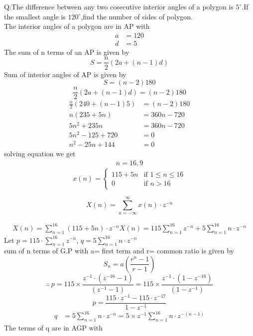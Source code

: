 \documentclass[journal,12pt,onecolumn]{IEEEtran}
\theoremstyle{remark}
\begin{document}
\let\vec\mathbf




\vspace{3cm}



\bigskip

\renewcommand{\thefigure}{\theenumi}
\renewcommand{\thetable}{\theenumi}
Q:The difference between any two cosecutive interior angles of a polygon is $5^\circ$.If the smallest angle is $120^\circ$,find the number of sides of polygon.
\\\solution
The interior angles of a polygon are in AP with
\begin{align*}
    a&=120\\
    d&=5
\end{align*}
The sum of n terms of an AP is given by
\begin{equation}
    S=\frac{n}{2}(2a+(n-1)d)
\end{equation}
Sum of interior angles of AP is given by
\begin{equation}
    S=(n-2)180
\end{equation}
\[\frac{n}{2}(2a+(n-1)d)= (n-2)180 \]
\[
\begin{aligned}
    \frac{n}{2}(240+(n-1)5)&=(n-2)180\\
    n(235+5n)&=360n-720\\
    5n^2+235n&=360n-720\\
    5n^2-125+720&=0\\
    n^2-25n+144&=0
\end{aligned}
\]
solving equation we get
\[
\begin{aligned}
   n=16,9
\end{aligned}
\]
\[ x(n) = \begin{cases}
          115 + 5n & \text{if }1 \leq n\leq 16 \\
          0 & \text{if } n >16
       \end{cases} \]

\[
X(n) = \sum_{n=-\infty}^{\infty} x(n) \cdot z^{-n}
\]

\[
\begin{aligned}
   X(n) = \sum_{n=1}^{16} (115+5n) \cdot z^{-n}
   X(n) = 115\sum_{n=1}^{16}z^{-n}+5\sum_{n=1}^{16}n\cdot z^{-n}
\end{aligned}
\]
Let \(p = 115 \cdot \sum_{n=1}^{16} z^{-n}\), \(q = 5\sum_{n=1}^{16}n\cdot z^{-n}\)\\
sum of n terms of G.P with a= first term and r= common ratio is given by
\[ S_n = a \left( \frac{r^n - 1}{r - 1} \right) \]
\[\therefore\ p=115\times \frac{z^{-1} \cdot ( z^{-16}-1)}{(z^{-1}-1)}=115\times \frac{z^{-1} \cdot (1 - z^{-16})}{(1 - z^{-1})} \]
\[p=\frac{115\cdot z^{-1}-115\cdot z^{-17}}{1-z^{-1}}\]
\[
\begin{aligned}
   q& = 5\sum_{n=1}^{16}n\cdot z^{-n}
   =5\times z^{-1}\sum_{n=1}^{16}n\cdot z^{-(n-1)}
\end{aligned}
\]
The terms of q are in AGP with 
\end{document}
